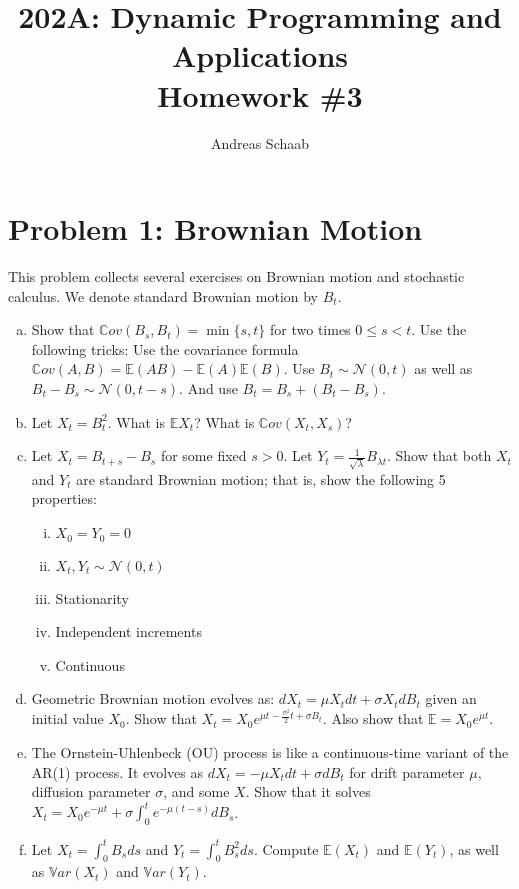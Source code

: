 \documentclass[11pt]{extarticle}
\title{202A: Dynamic Programming and Applications\\[5pt] {\Large \textbf{Homework \#3}}}
\author{Andreas Schaab}
\date{}
\theoremstyle{plain}
\theoremstyle{definition}
\begin{document}
\maketitle



\section*{Problem 1: Brownian Motion}

This problem collects several exercises on Brownian motion and stochastic calculus. We denote standard Brownian motion by $B_t$.

\begin{enumerate}[(a)]

\item Show that $\mathbb Cov(B_s, B_t) = \min\{s, t\}$ for two times $0 \leq s < t$. Use the following tricks: Use the covariance formula $\mathbb Cov(A, B) = \mathbb E (AB) - \mathbb E(A) \mathbb E(B)$. Use $B_t \sim \mathcal N(0, t)$ as well as $B_t - B_s \sim \mathcal N(0, t-s)$. And use $B_t = B_s + (B_t - B_s)$.


\item Let $X_t = B_t^2$. What is $\mathbb E X_t$? What is $\mathbb Cov (X_t, X_s)$?


\item Let $X_t = B_{t+s} - B_s$ for some fixed $s > 0$. Let $Y_t = \frac{1}{\sqrt \lambda} B_{\lambda t}$. Show that both $X_t$ and $Y_t$ are standard Brownian motion; that is, show the following 5 properties: 
\begin{enumerate}[(i)]
\item $X_0 = Y_0 = 0$ 
\item $X_t, Y_t \sim \mathcal N(0, t)$ 
\item Stationarity
\item Independent increments 
\item Continuous 
\end{enumerate}


\item Geometric Brownian motion evolves as: $dX_t = \mu X_t dt + \sigma X_t dB_t$ given an initial value $X_0$. Show that $X_t = X_0 e^{\mu t - \frac{\sigma^2}{2} t + \sigma B_t}$. Also show that $\mathbb E = X_0 e^{\mu t}$.

\item The Ornstein-Uhlenbeck (OU) process is like a continuous-time variant of the AR(1) process. It evolves as $dX_t = - \mu X_t dt + \sigma dB_t$ for drift parameter $\mu$, diffusion parameter $\sigma$, and some $X$. Show that it solves $X_t = X_0 e^{- \mu t} + \sigma \int_0^t e^{-\mu(t - s)} dB_s$.

\item Let $X_t = \int_0^t B_s ds$ and $Y_t = \int_0^t B_s^2 ds$. Compute $\mathbb E(X_t)$ and $\mathbb E(Y_t)$, as well as $\mathbb Var(X_t)$ and $\mathbb Var(Y_t)$. 
\end{enumerate}
\end{document}
